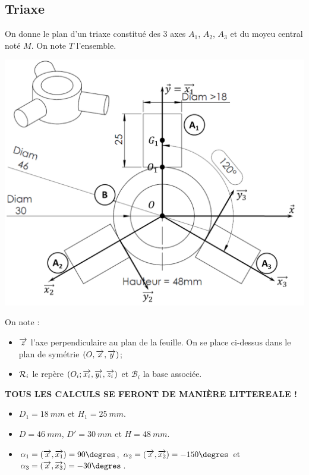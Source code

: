 \documentclass[10pt,fleqn]{article} %
\begin{document}
\begin{multicols}{2}
\section*{Triaxe}
\setcounter{exo}{0}
On donne le plan d'un triaxe constitué des 3 axes $A_1$, $A_2$, $A_3$ et du moyeu central noté $M$. On note  $T$ l'ensemble.

\begin{center}
\includegraphics[width=\linewidth]{images/triaxe.png}
\end{center}
On note :
\begin{itemize}
\item $\overrightarrow{z}$ l'axe perpendiculaire au plan de la feuille. On se place ci-dessus dans le plan de symétrie $\left(O,\overrightarrow{x},\overrightarrow{y}\right)$;
\item $\mathcal{R}_{i}$ le repère $\left(O_i;\overrightarrow{x_i},\overrightarrow{y_i},\overrightarrow{z_i} \right)$ et $\mathcal{B}_i$ la base associée.
\end{itemize}





\textbf{TOUS LES CALCULS SE FERONT DE MANIÈRE LITTEREALE !}
\begin{itemize}
\item $D_1=\SI{18}{mm}$ et $H_1=\SI{25}{mm}$.
\item $D=\SI{46}{mm}$, $D'=\SI{30}{mm}$ et $H=\SI{48}{mm}$.
\item $\alpha_1=\angl{x}{x_1}=90\degres$, $\alpha_2=\angl{x}{x_2}=-150\degres$ et 
$\alpha_3=\angl{x}{x_3}=-30\degres$.
\end{itemize}


\end{multicols}
\end{document}
